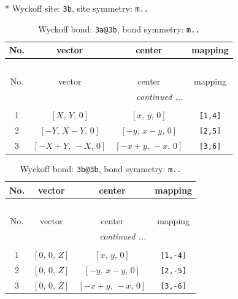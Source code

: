 \documentclass[fleqn,8pt]{jsarticle}
\begin{document}
* Wyckoff site: {\tt 3b}, site symmetry: {\tt m..}
\renewcommand{\arraystretch}{1.2}
\begin{longtable}{cccc}
\caption{Wyckoff bond: {\tt 3a@3b}, bond symmetry: {\tt m..}}
 \\
 \hline \hline
No. & vector & center & mapping \\ \hline \endfirsthead

\multicolumn{3}{l}{\tablename\ \thetable{}} \\
 \hline \hline
No. & vector & center & mapping \\ \hline \endhead

 \hline \hline
\multicolumn{3}{r}{\footnotesize\it continued ...} \\ \endfoot

 \hline \hline
\multicolumn{3}{r}{} \\ \endlastfoot

1 & $\left[ X,\, Y,\, 0 \right]$ & $\left[ x,\, y,\, 0 \right]$ & {\tt [1,4]} \\ \hline
2 & $\left[ - Y,\, X - Y,\, 0 \right]$ & $\left[ - y,\, x - y,\, 0 \right]$ & {\tt [2,5]} \\ \hline
3 & $\left[ - X + Y,\, - X,\, 0 \right]$ & $\left[ - x + y,\, - x,\, 0 \right]$ & {\tt [3,6]} \\
\end{longtable}
\renewcommand{\arraystretch}{1.2}
\begin{longtable}{cccc}
\caption{Wyckoff bond: {\tt 3b@3b}, bond symmetry: {\tt m..}}
 \\
 \hline \hline
No. & vector & center & mapping \\ \hline \endfirsthead

\multicolumn{3}{l}{\tablename\ \thetable{}} \\
 \hline \hline
No. & vector & center & mapping \\ \hline \endhead

 \hline \hline
\multicolumn{3}{r}{\footnotesize\it continued ...} \\ \endfoot

 \hline \hline
\multicolumn{3}{r}{} \\ \endlastfoot

1 & $\left[ 0,\, 0,\, Z \right]$ & $\left[ x,\, y,\, 0 \right]$ & {\tt [1,-4]} \\ \hline
2 & $\left[ 0,\, 0,\, Z \right]$ & $\left[ - y,\, x - y,\, 0 \right]$ & {\tt [2,-5]} \\ \hline
3 & $\left[ 0,\, 0,\, Z \right]$ & $\left[ - x + y,\, - x,\, 0 \right]$ & {\tt [3,-6]} \\
\end{longtable}
\end{document}
